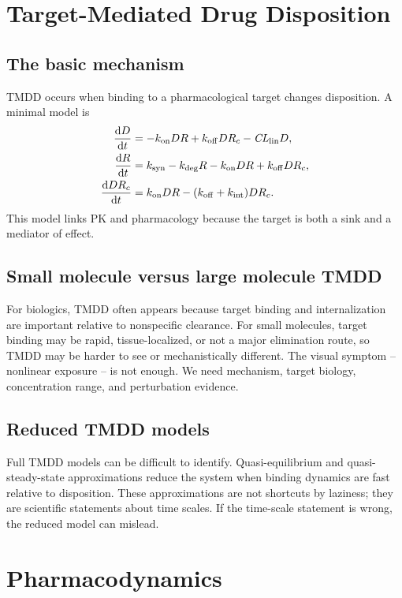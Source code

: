 \documentclass[a4paper]{article}
\newcommand{\pkCL}{\pksym{CL}}
\begin{document}
\section{Target-Mediated Drug Disposition}

\subsection{The basic mechanism}

TMDD occurs when binding to a pharmacological target changes disposition. A minimal model is
\[
  \begin{aligned}
  \frac{\dd D}{\dd t}
  &=
  -k_{\pklab{on}}DR+k_{\pklab{off}}DR_c-\pkCL_{\pklab{lin}}D,\\
  \frac{\dd R}{\dd t}
  &=
  k_{\pklab{syn}}-k_{\pklab{deg}}R
  -k_{\pklab{on}}DR+k_{\pklab{off}}DR_c,\\
  \frac{\dd DR_c}{\dd t}
  &=
  k_{\pklab{on}}DR-(k_{\pklab{off}}+k_{\pklab{int}})DR_c.
  \end{aligned}
\]
This model links PK and pharmacology because the target is both a sink and a mediator of effect.

\figureTMDD

\subsection{Small molecule versus large molecule TMDD}

For biologics, TMDD often appears because target binding and internalization are important relative to nonspecific clearance. For small molecules, target binding may be rapid, tissue-localized, or not a major elimination route, so TMDD may be harder to see or mechanistically different. The visual symptom -- nonlinear exposure -- is not enough. We need mechanism, target biology, concentration range, and perturbation evidence.

\subsection{Reduced TMDD models}

Full TMDD models can be difficult to identify. Quasi-equilibrium and quasi-steady-state approximations reduce the system when binding dynamics are fast relative to disposition. These approximations are not shortcuts by laziness; they are scientific statements about time scales. If the time-scale statement is wrong, the reduced model can mislead.

\section{Pharmacodynamics}
\end{document}
